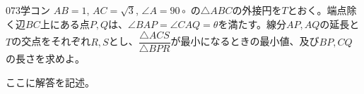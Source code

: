 \begin{prob}{073}{}{学コン}
 $AB=1$, $AC=\sqrt{3}$, $\angle{A}=90\circ$ の$\triangle{ABC}$の外接円を$T$とおく。端点除く辺$BC$上にある点$P, Q$は、$\angle{BAP}=\angle{CAQ}=\theta$を満たす。線分$AP, AQ$の延長と$T$の交点をそれぞれ$R, S$とし、$\dfrac{\triangle{ACS}}{\triangle{BPR}}$が最小になるときの最小値、及び$BP, CQ$の長さを求めよ。
\end{prob}
ここに解答を記述。